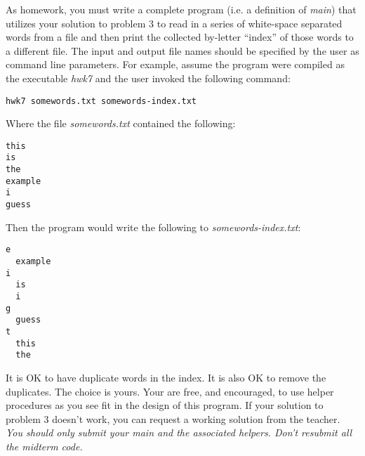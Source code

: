 \documentclass[10pt]{article}
\begin{document}
As homework, you must write a complete program (i.e. a definition of \textit{main}) that utilizes your solution to problem 3 to read in a series of white-space separated words from a file and then print the collected by-letter ``index'' of those words to a different file.  The input and output file names should be specified by the user as command line parameters. For example, assume the program were compiled as the executable \textit{hwk7} and the user invoked the following command:

\begin{verbatim}
hwk7 somewords.txt somewords-index.txt
\end{verbatim}

Where the file \textit{somewords.txt} contained the following:

\begin{verbatim}
this
is
the
example
i
guess
\end{verbatim}

Then the program would write the following to \textit{somewords-index.txt}:

\begin{verbatim}
e
  example
i
  is
  i
g
  guess
t
  this
  the
\end{verbatim}

It is OK to have duplicate words in the index. It is also OK to remove the duplicates. The choice is yours. Your are free, and encouraged, to use helper procedures as you see fit in the design of this program.  If your solution to problem 3 doesn't work, you can request a working solution from the teacher. \textit{You should only submit your main and the associated helpers.  Don't resubmit all the midterm code. }
\end{document}
